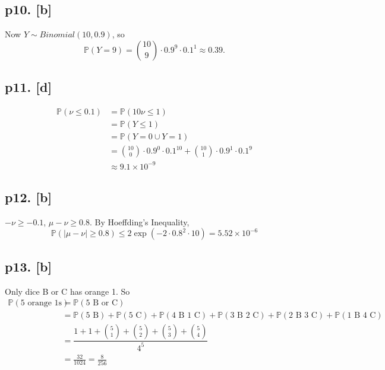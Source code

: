 \subsection*{p10. [b]}
Now $Y \sim Binomial(10, 0.9)$, so
\[
    \mathbb{P}(Y=9) = {10\choose9}\cdot0.9^9\cdot0.1^1 \approx 0.39.
\]

\subsection*{p11. [d]}
\begin{align*}
\mathbb{P}(\nu \leq 0.1) &= \mathbb{P}(10\nu \leq 1)\\
	&= \mathbb{P}(Y\leq1)\\
    &= \mathbb{P}(Y = 0 \cup Y=1)\\
    &= {10\choose0}\cdot0.9^0\cdot0.1^{10} + {10\choose1}\cdot0.9^1\cdot0.1^9 \\
    &\approx 9.1 \times 10^{-9}
\end{align*}

\subsection*{p12. [b]}
$-\nu \geq -0.1$, $\mu - \nu \geq 0.8$. By Hoeffding's Inequality,
\[
    \mathbb{P}(|\mu - \nu| \geq 0.8) \leq 2\exp(-2\cdot0.8^2\cdot10) = 5.52 \times 10^{-6}
\]

\subsection*{p13. [b]}
Only dice B or C has orange 1. So
\begin{align*}
\mathbb{P}(\text{5 orange 1s}) &= \mathbb{P}(\text{5 B or C})\\
    &= \mathbb{P}(\text{5 B}) + \mathbb{P}(\text{5 C}) 
        + \mathbb{P}(\text{4 B 1 C}) + \mathbb{P}(\text{3 B 2 C}) + \mathbb{P}(\text{2 B 3 C}) + \mathbb{P}(\text{1 B 4 C})\\
        &= \dfrac{1 + 1 + {5 \choose 1} + {5 \choose 2} + {5 \choose 3} + {5 \choose 4}}{4^5}\\
        &= \frac{32}{1024} = \frac8{256}
\end{align*}

